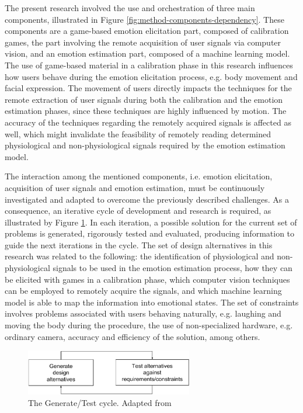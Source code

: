 The present research involved the use and orchestration of three main components, illustrated in Figure \ref{fig:method-components-dependency}. These components are a game-based emotion elicitation part, composed of calibration games, the part involving the remote acquisition of user signals via computer vision, and an emotion estimation part, composed of a machine learning model. The use of game-based material in a calibration phase in this research influences how users behave during the emotion elicitation process, e.g. body movement and facial expression. The movement of users directly impacts the techniques for the remote extraction of user signals during both the calibration and the emotion estimation phases, since these techniques are highly influenced by motion. The accuracy of the techniques regarding the remotely acquired signals is affected as well, which might invalidate the feasibility of remotely reading determined physiological and non-physiological signals required by the emotion estimation model.

The interaction among the mentioned components, i.e. emotion elicitation, acquisition of user signals and emotion estimation, must be continuously investigated and adapted to overcome the previously described challenges. As a consequence, an iterative cycle of development and research is required, as illustrated by Figure \ref{fig:hevner-generate-test}. In each iteration, a possible solution for the current set of problems is generated, rigorously tested and evaluated, producing information to guide the next iterations in the cycle. The set of design alternatives in this research was related to the following: the identification of physiological and non-physiological signals to be used in the emotion estimation process, how they can be elicited with games in a calibration phase, which computer vision techniques can be employed to remotely acquire the signals, and which machine learning model is able to map the information into emotional states. The set of constraints involves problems associated with users behaving naturally, e.g. laughing and moving the body during the procedure, the use of non-specialized hardware, e.g. ordinary camera, accuracy and efficiency of the solution, among others.

\begin{figure}[h]
    \centering
    \includegraphics[width=0.65\textwidth]{Content/figures/hevner-generate-test}
    \caption{The Generate/Test cycle. Adapted from \textcite{hevner2004design}}
    \label{fig:hevner-generate-test}
\end{figure}

